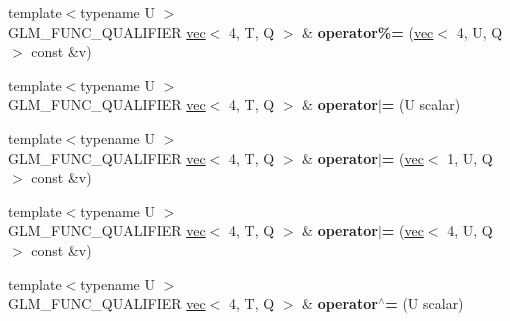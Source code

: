\begin{DoxyCompactItemize}
\item 
\mbox{\label{structglm_1_1vec_3_014_00_01T_00_01Q_01_4_a6f41e8cbca8438ff8a864f913f2801b2}} 
{\footnotesize template$<$typename U $>$ }\\G\+L\+M\+\_\+\+F\+U\+N\+C\+\_\+\+Q\+U\+A\+L\+I\+F\+I\+ER \hyperlink{structglm_1_1vec}{vec}$<$ 4, T, Q $>$ \& {\bfseries operator\%=} (\hyperlink{structglm_1_1vec}{vec}$<$ 4, U, Q $>$ const \&v)
\item 
\mbox{\label{structglm_1_1vec_3_014_00_01T_00_01Q_01_4_abe08fcb3638c6605f6b404ca5c4621d5}} 
{\footnotesize template$<$typename U $>$ }\\G\+L\+M\+\_\+\+F\+U\+N\+C\+\_\+\+Q\+U\+A\+L\+I\+F\+I\+ER \hyperlink{structglm_1_1vec}{vec}$<$ 4, T, Q $>$ \& {\bfseries operator$\vert$=} (U scalar)
\item 
\mbox{\label{structglm_1_1vec_3_014_00_01T_00_01Q_01_4_a3d9704513aa8df8d05bc30d20dd6bc71}} 
{\footnotesize template$<$typename U $>$ }\\G\+L\+M\+\_\+\+F\+U\+N\+C\+\_\+\+Q\+U\+A\+L\+I\+F\+I\+ER \hyperlink{structglm_1_1vec}{vec}$<$ 4, T, Q $>$ \& {\bfseries operator$\vert$=} (\hyperlink{structglm_1_1vec}{vec}$<$ 1, U, Q $>$ const \&v)
\item 
\mbox{\label{structglm_1_1vec_3_014_00_01T_00_01Q_01_4_aea8bc26beedb4f4fbb6a4d0ad4e02a86}} 
{\footnotesize template$<$typename U $>$ }\\G\+L\+M\+\_\+\+F\+U\+N\+C\+\_\+\+Q\+U\+A\+L\+I\+F\+I\+ER \hyperlink{structglm_1_1vec}{vec}$<$ 4, T, Q $>$ \& {\bfseries operator$\vert$=} (\hyperlink{structglm_1_1vec}{vec}$<$ 4, U, Q $>$ const \&v)
\item 
\mbox{\label{structglm_1_1vec_3_014_00_01T_00_01Q_01_4_a123f810174d23a4d1b1eaf299a4e6f51}} 
{\footnotesize template$<$typename U $>$ }\\G\+L\+M\+\_\+\+F\+U\+N\+C\+\_\+\+Q\+U\+A\+L\+I\+F\+I\+ER \hyperlink{structglm_1_1vec}{vec}$<$ 4, T, Q $>$ \& {\bfseries operator$^\wedge$=} (U scalar)
\item 
\mbox{\label{structglm_1_1vec_3_014_00_01T_00_01Q_01_4_a926de242b3187323bfc98e42863c23d3}} 

\end{DoxyCompactItemize}
